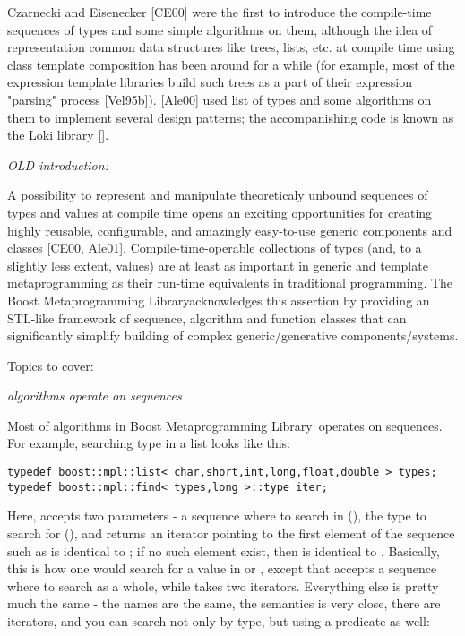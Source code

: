 \documentclass{netobjectdays}
\newcommand{\Mpl}{Boost Meta\-program\-ming Library}
\begin{document}
Czarnecki and Eisenecker [CE00] were the first to introduce 
the compile-time sequences of types and some simple algorithms 
on them, although the idea of representation common data 
structures like trees, lists, etc. at compile time using class 
template composition has been around for a while (for example, 
most of the expression template libraries build such trees as 
a part of their expression "parsing" process [Vel95b]). 
[Ale00] used list of types and some algorithms on them to 
implement several design patterns; the accompanishing code 
is known as the Loki library []. 

\emph{OLD introduction:}

A possibility to represent and manipulate theoreticaly 
unbound sequences of types and values at compile time opens an 
exciting opportunities for creating highly reusable, 
configurable, and amazingly easy-to-use generic components and 
classes [CE00, Ale01]. Compile-time-operable collections of 
types (and, to a slightly less extent, values) are at least as 
important in generic and template metaprogramming as their 
run-time equivalents in traditional programming. 
The \Mpl acknowledges this assertion by providing an 
STL-like framework of sequence, algorithm and function classes 
that can significantly simplify building of complex 
generic/generative components/systems. 

Topics to cover:

\emph{algorithms operate on sequences}
  
Most of algorithms in \Mpl\ operates on sequences. For example, 
searching type in a list looks like this:

{\footnotesize
\begin{verbatim}
typedef boost::mpl::list< char,short,int,long,float,double > types;
typedef boost::mpl::find< types,long >::type iter;
\end{verbatim}
}

Here,  accepts two parameters - a sequence where to 
search in (), the type to search for (), 
and returns an iterator  pointing to the first 
element of the sequence such as  is identical 
to ; if no such element exist, then  is 
identical to . Basically, this is how one 
would search for a value in  or 
, except that  accepts 
a sequence where to search as a whole, while  
takes two iterators. 
Everything else is pretty much the same - the names are the same, 
the semantics is very close, there are iterators, and you can 
search not only by type, but using a predicate as well:
\end{document}
